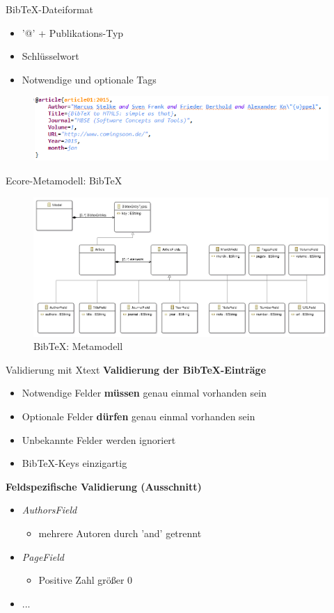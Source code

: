 \documentclass[fleqn,11pt,aspectratio=43]{beamer}
\begin{document}
\begin{frame}{BibTeX-Dateiformat}
\begin{itemize}
\item '@' + Publikations-Typ
\item Schlüsselwort
\item Notwendige und optionale Tags
\end{itemize}
\begin{figure}
\includegraphics[scale=0.6]{../bibtex_format1.png} 
\end{figure}
\end{frame}

\begin{frame}{Ecore-Metamodell: BibTeX}
\begin{figure}
\includegraphics[scale=0.28]{../bibtex_ecore.png} 
\caption{BibTeX: Metamodell}
\end{figure}  
\end{frame}

\begin{frame}{Validierung mit Xtext}
\textbf{Validierung der BibTeX-Einträge}
\begin{itemize}
\item Notwendige Felder \textbf{müssen} genau einmal vorhanden sein
\item Optionale Felder \textbf{dürfen} genau einmal vorhanden sein
\item Unbekannte Felder werden ignoriert
\item BibTeX-Keys einzigartig
\end{itemize}

\textbf{Feldspezifische Validierung (Ausschnitt)}
\begin{itemize}
\item \textit{AuthorsField}
\begin{itemize}
\item mehrere Autoren durch 'and' getrennt
\end{itemize}
\item \textit{PageField}
\begin{itemize}
\item Positive Zahl größer 0
\end{itemize}
\item ...
\end{itemize}
\end{frame}
\end{document}
